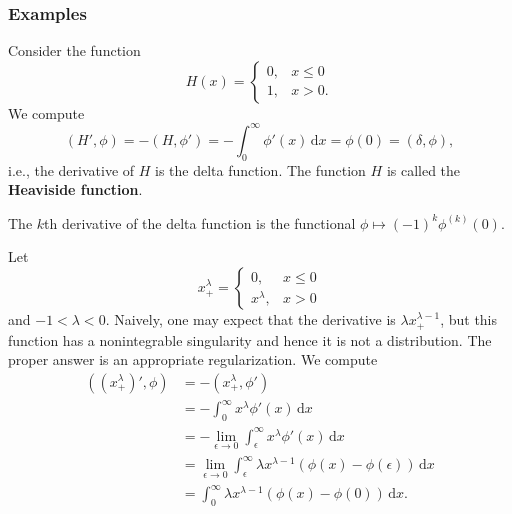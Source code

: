 \subsubsection{Examples}\label{subsec:distribution-derivative-examples}

\begin{Example}
\label{ex:heaviside-derivative}
Consider the function
\begin{equation}\label{eq:heaviside-function-definition}
H(x)=\begin{cases}0,&x\leq0\\1,&x>0.\end{cases}
\end{equation}
We compute
\begin{equation}\label{eq:heaviside-derivative-delta-pairing}
(H',\phi)=-(H,\phi')=-\int_0^\infty\phi'(x)\,\mathrm{d}x=\phi(0)=(\delta,\phi),
\end{equation}
i.e., the derivative of $H$ is the delta function. The function $H$ is called the \textbf{Heaviside function}.
\end{Example}

\begin{Example}
\label{ex:higher-delta-derivative}
The $k$th derivative of the delta function is the functional $\phi\mapsto(-1)^k\phi^{(k)}(0)$.
\end{Example}

\begin{Example}
\label{ex:singular-power-derivative}
Let
\begin{equation}\label{eq:positive-part-singular-power}
x_+^\lambda=\begin{cases}0,&x\leq0\\x^\lambda,&x>0\end{cases}
\end{equation}
and $-1<\lambda<0$. Naively, one may expect that the derivative is $\lambda x_+^{\lambda-1}$, but this function has a nonintegrable singularity and hence it is not a distribution. The proper answer is an appropriate regularization. We compute\[
\begin{aligned}
((x_+^\lambda)',\phi)&=-(x_+^\lambda,\phi')\\
&=-\int_0^\infty x^\lambda\phi'(x)\,\mathrm{d}x\\
&=-\lim_{\epsilon\to0}\int_\epsilon^\infty x^\lambda\phi'(x)\,\mathrm{d}x\\
&=\lim_{\epsilon\to0}\int_\epsilon^\infty\lambda x^{\lambda-1}(\phi(x)-\phi(\epsilon))\,\mathrm{d}x\\
&=\int_0^\infty\lambda x^{\lambda-1}(\phi(x)-\phi(0))\,\mathrm{d}x.
\end{aligned}
\]
\end{Example}

